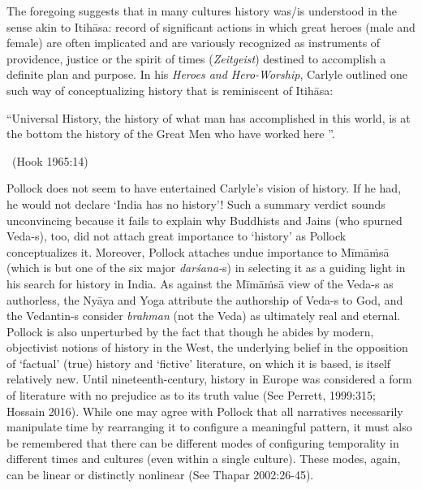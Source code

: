 The foregoing suggests that in many cultures history was/is understood in the sense akin to Itihāsa: record of significant actions in which great heroes (male and female) are often implicated and are variously recognized as instruments of providence, justice or the spirit of times (\textit{Zeitgeist}) destined to accomplish a definite plan and purpose. In his \textit{Heroes and Hero-Worship}, Carlyle outlined one such way of conceptualizing history that is reminiscent of Itihāsa:

\begin{myquote}
“Universal History, the history of what man has accomplished in this world, is at the bottom the history of the Great Men who have worked here ”.

~\hfill (Hook 1965:14)
\end{myquote}

Pollock does not seem to have entertained Carlyle’s vision of history. If he had, he would not declare ‘India has no history’! Such a summary verdict sounds unconvincing because it fails to explain why Buddhists and Jains (who spurned Veda-s), too, did not attach great importance to ‘history’ as Pollock conceptualizes it. Moreover, Pollock attaches undue importance to Mīmāṁsā (which is but one of the six major \textit{darśana-}s) in selecting it as a guiding light in his search for history in India. As against the Mīmāṁsā view of the Veda-s as authorless, the Nyāya and Yoga attribute the authorship of \hbox{Veda-s} to God, and the Vedantin-s consider \textit{brahman} (not the Veda) as ultimately real and eternal. Pollock is also unperturbed by the fact that though he abides by modern, objectivist notions of history in the West, the underlying belief in the opposition of ‘factual’ (true) history and ‘fictive’ literature, on which it is based, is itself relatively new. Until nineteenth-century, history in Europe was considered a form of literature with no prejudice as to its truth value (See Perrett, 1999:315; Hossain 2016). While one may agree with Pollock that all narratives necessarily manipulate time by rearranging it to configure a meaningful pattern, it must also be remembered that there can be different modes of configuring temporality in different times and cultures (even within a single culture). These modes, again, can be linear or distinctly nonlinear (See Thapar 2002:26-45).


